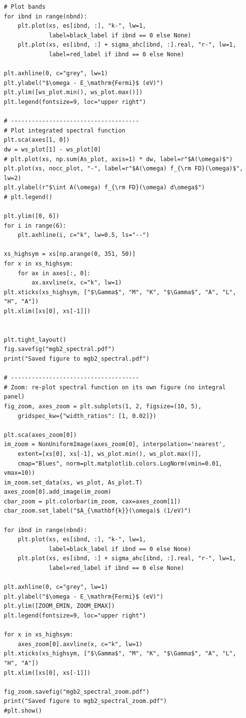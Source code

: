 \documentclass[a4paper,11pt,serif]{article}
\begin{document}
\begin{scriptsize}
\begin{Verbatim}[frame=single]
# Plot bands
for ibnd in range(nbnd):
    plt.plot(xs, es[ibnd, :], "k-", lw=1,
             label=black_label if ibnd == 0 else None)
    plt.plot(xs, es[ibnd, :] + sigma_ahc[ibnd, :].real, "r-", lw=1,
             label=red_label if ibnd == 0 else None)

plt.axhline(0, c="grey", lw=1)
plt.ylabel("$\omega - E_\mathrm{Fermi}$ (eV)")
plt.ylim([ws_plot.min(), ws_plot.max()])
plt.legend(fontsize=9, loc="upper right")

# -------------------------------------
# Plot integrated spectral function
plt.sca(axes[1, 0])
dw = ws_plot[1] - ws_plot[0]
# plt.plot(xs, np.sum(As_plot, axis=1) * dw, label=r"$A(\omega)$")
plt.plot(xs, nocc_plot, "-", label=r"$A(\omega) f_{\rm FD}(\omega)$", lw=2)
plt.ylabel(r"$\int A(\omega) f_{\rm FD}(\omega) d\omega$")
# plt.legend()

plt.ylim([0, 6])
for i in range(6):
    plt.axhline(i, c="k", lw=0.5, ls="--")

xs_highsym = xs[np.arange(0, 351, 50)]
for x in xs_highsym:
    for ax in axes[:, 0]:
        ax.axvline(x, c="k", lw=1)
plt.xticks(xs_highsym, ["$\Gamma$", "M", "K", "$\Gamma$", "A", "L", "H", "A"])
plt.xlim([xs[0], xs[-1]])


plt.tight_layout()
fig.savefig("mgb2_spectral.pdf")
print("Saved figure to mgb2_spectral.pdf")

# -------------------------------------
# Zoom: re-plot spectral function on its own figure (no integral panel)
fig_zoom, axes_zoom = plt.subplots(1, 2, figsize=(10, 5),
    gridspec_kw={"width_ratios": [1, 0.02]})

plt.sca(axes_zoom[0])
im_zoom = NonUniformImage(axes_zoom[0], interpolation='nearest',
    extent=[xs[0], xs[-1], ws_plot.min(), ws_plot.max()],
    cmap="Blues", norm=plt.matplotlib.colors.LogNorm(vmin=0.01, vmax=10))
im_zoom.set_data(xs, ws_plot, As_plot.T)
axes_zoom[0].add_image(im_zoom)
cbar_zoom = plt.colorbar(im_zoom, cax=axes_zoom[1])
cbar_zoom.set_label("$A_{\mathbf{k}}(\omega)$ (1/eV)")

for ibnd in range(nbnd):
    plt.plot(xs, es[ibnd, :], "k-", lw=1,
             label=black_label if ibnd == 0 else None)
    plt.plot(xs, es[ibnd, :] + sigma_ahc[ibnd, :].real, "r-", lw=1,
             label=red_label if ibnd == 0 else None)

plt.axhline(0, c="grey", lw=1)
plt.ylabel("$\omega - E_\mathrm{Fermi}$ (eV)")
plt.ylim([ZOOM_EMIN, ZOOM_EMAX])
plt.legend(fontsize=9, loc="upper right")

for x in xs_highsym:
    axes_zoom[0].axvline(x, c="k", lw=1)
plt.xticks(xs_highsym, ["$\Gamma$", "M", "K", "$\Gamma$", "A", "L", "H", "A"])
plt.xlim([xs[0], xs[-1]])

fig_zoom.savefig("mgb2_spectral_zoom.pdf")
print("Saved figure to mgb2_spectral_zoom.pdf")
#plt.show()
\end{Verbatim}
\end{scriptsize}
\end{document}
